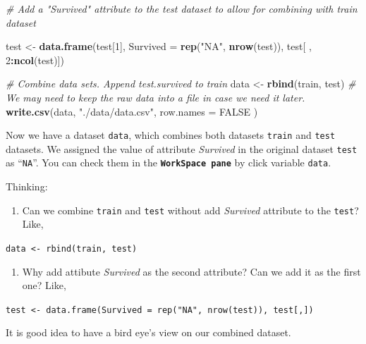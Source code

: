 \documentclass[
]{book}
\newenvironment{Shaded}{\begin{snugshade}}{\end{snugshade}}
\newcommand{\CommentTok}[1]{\textcolor[rgb]{0.56,0.35,0.01}{\textit{#1}}}
\newcommand{\DataTypeTok}[1]{\textcolor[rgb]{0.13,0.29,0.53}{#1}}
\newcommand{\DecValTok}[1]{\textcolor[rgb]{0.00,0.00,0.81}{#1}}
\newcommand{\KeywordTok}[1]{\textcolor[rgb]{0.13,0.29,0.53}{\textbf{#1}}}
\newcommand{\NormalTok}[1]{#1}
\newcommand{\OperatorTok}[1]{\textcolor[rgb]{0.81,0.36,0.00}{\textbf{#1}}}
\newcommand{\OtherTok}[1]{\textcolor[rgb]{0.56,0.35,0.01}{#1}}
\newcommand{\StringTok}[1]{\textcolor[rgb]{0.31,0.60,0.02}{#1}}
\providecommand{\tightlist}{%
  \setlength{\itemsep}{0pt}\setlength{\parskip}{0pt}}
\begin{document}
\begin{Shaded}
\begin{Highlighting}[]
\CommentTok{# Add a "Survived" attribute to the test dataset to allow for combining with train dataset}

\NormalTok{test <-}\StringTok{ }\KeywordTok{data.frame}\NormalTok{(test[}\DecValTok{1}\NormalTok{], }\DataTypeTok{Survived =} \KeywordTok{rep}\NormalTok{(}\StringTok{"NA"}\NormalTok{, }\KeywordTok{nrow}\NormalTok{(test)), test[ , }\DecValTok{2}\OperatorTok{:}\KeywordTok{ncol}\NormalTok{(test)])}

\CommentTok{# Combine data sets. Append test.survived to train}
\NormalTok{data <-}\StringTok{ }\KeywordTok{rbind}\NormalTok{(train, test)}
\CommentTok{# We may need to keep the raw data into a file in case we need it later.}
\KeywordTok{write.csv}\NormalTok{(data, }\StringTok{"./data/data.csv"}\NormalTok{, }\DataTypeTok{row.names =} \OtherTok{FALSE}\NormalTok{ )}
\end{Highlighting}
\end{Shaded}

Now we have a dataset \texttt{data}, which combines both datasets \texttt{train} and \texttt{test} datasets. We assigned the value of attribute \emph{Survived} in the original dataset \texttt{test} as ``\texttt{NA}''. You can check them in the \textbf{\texttt{WorkSpace\ pane}} by click variable \texttt{data}.

\begin{rmdtry}
Thinking:

\begin{enumerate}
\def\labelenumi{\arabic{enumi}.}
\tightlist
\item
  Can we combine \texttt{train} and \texttt{test} without add \emph{Survived} attribute to the \texttt{test}? Like,
\end{enumerate}

\texttt{data\ \textless{}-\ rbind(train,\ test)}

\begin{enumerate}
\def\labelenumi{\arabic{enumi}.}
\setcounter{enumi}{1}
\tightlist
\item
  Why add attibute \emph{Survived} as the second attribute? Can we add it as the first one? Like,
\end{enumerate}

\texttt{test\ \textless{}-\ data.frame(Survived\ =\ rep("NA",\ nrow(test)),\ test{[},{]})}
\end{rmdtry}

It is good idea to have a bird eye's view on our combined dataset.
\end{document}

